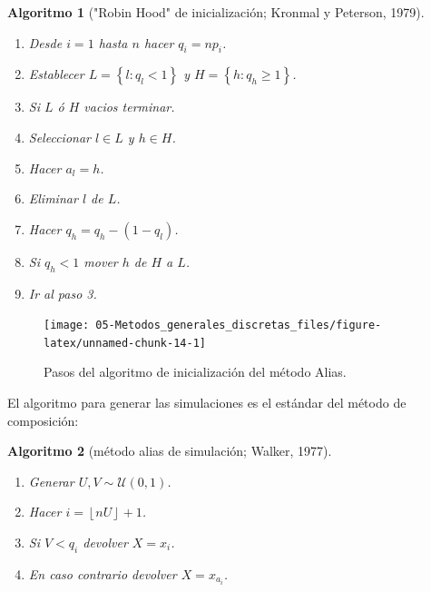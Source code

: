 \documentclass[
  10pt,
]{book}
\theoremstyle{break}
\newtheorem{conjecture}{Algoritmo}[chapter]
\theoremstyle{nonumberplain}
\begin{document}
\begin{conjecture}["Robin Hood" de inicialización; Kronmal y Peterson, 1979]
\protect\hypertarget{cnj:robin-hood}{}\label{cnj:robin-hood}

\begin{enumerate}
\def\labelenumi{\arabic{enumi}.}
\item
  Desde \(i=1\) hasta \(n\) hacer \(q_{i}=np_{i}\).
\item
  Establecer \(L=\left\{ l:q_{l}<1\right\}\) y
  \(H=\left\{ h:q_{h}\geq 1\right\}\).
\item
  Si \(L\) ó \(H\) vacios terminar.
\item
  Seleccionar \(l\in L\) y \(h\in H\).
\item
  Hacer \(a_{l}=h\).
\item
  Eliminar \(l\) de \(L\).
\item
  Hacer \(q_{h}=q_{h}-\left( 1-q_{l}\right)\).
\item
  Si \(q_{h}<1\) mover \(h\) de \(H\) a \(L\).
\item
  Ir al paso 3.
\end{enumerate}

\end{conjecture}

\begin{figure}[!htbp]

{\centering \texttt{[image: 05-Metodos\_generales\_discretas\_files/figure-latex/unnamed-chunk-14-1]} 

}

\caption{Pasos del algoritmo de inicialización del método Alias.}\label{fig:unnamed-chunk-14}
\end{figure}

El algoritmo para generar las simulaciones es el estándar del método de composición:

\begin{conjecture}[método alias de simulación; Walker, 1977]
\protect\hypertarget{cnj:walker}{}\label{cnj:walker}

\begin{enumerate}
\def\labelenumi{\arabic{enumi}.}
\item
  Generar \(U,V\sim \mathcal{U}\left( 0,1\right)\).
\item
  Hacer \(i=\left\lfloor nU\right\rfloor +1\).
\item
  Si \(V<q_{i}\) devolver \(X=x_{i}\).
\item
  En caso contrario devolver \(X=x_{a_{i}}\).
\end{enumerate}

\end{conjecture}
\end{document}
